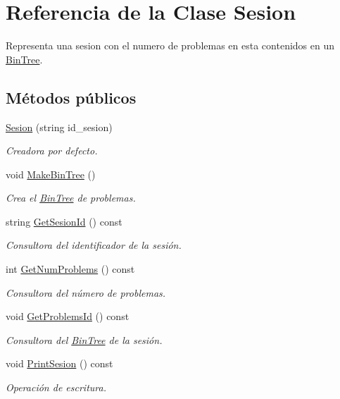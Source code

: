 \hypertarget{class_sesion}{}\section{Referencia de la Clase Sesion}
\label{class_sesion}


Representa una sesion con el numero de problemas en esta contenidos en un \mbox{\hyperlink{class_bin_tree}{Bin\+Tree}}.  


\subsection*{Métodos públicos}
\begin{DoxyCompactItemize}
\item 
\mbox{\hyperlink{class_sesion_a91a29b1563a9f089d6dc50933281a968}{Sesion}} (string id\+\_\+sesion)
\begin{DoxyCompactList}\small\item\em Creadora por defecto. \end{DoxyCompactList}\item 
void \mbox{\hyperlink{class_sesion_a0bdd1600ecaf2f98a74ba30611a3bb6f}{Make\+Bin\+Tree}} ()
\begin{DoxyCompactList}\small\item\em Crea el \mbox{\hyperlink{class_bin_tree}{Bin\+Tree}} de problemas. \end{DoxyCompactList}\item 
string \mbox{\hyperlink{class_sesion_a9f3c532f36fb49a6caa5dd82b9ee9a3f}{Get\+Sesion\+Id}} () const
\begin{DoxyCompactList}\small\item\em Consultora del identificador de la sesión. \end{DoxyCompactList}\item 
int \mbox{\hyperlink{class_sesion_ad770a0d4c75b0b2d70fa6c5cdcf336ec}{Get\+Num\+Problems}} () const
\begin{DoxyCompactList}\small\item\em Consultora del número de problemas. \end{DoxyCompactList}\item 
void \mbox{\hyperlink{class_sesion_af8f21957c77c2a3f7a1f923f2779cc41}{Get\+Problems\+Id}} () const
\begin{DoxyCompactList}\small\item\em Consultora del \mbox{\hyperlink{class_bin_tree}{Bin\+Tree}} de la sesión. \end{DoxyCompactList}\item 
void \mbox{\hyperlink{class_sesion_abd39f61f782fffbaa2e151e0e51b9636}{Print\+Sesion}} () const
\begin{DoxyCompactList}\small\item\em Operación de escritura. \end{DoxyCompactList}\end{DoxyCompactItemize}


